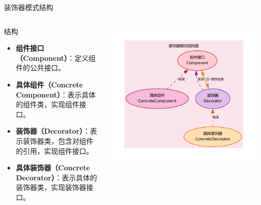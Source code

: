 \documentclass[UTF8,aspectratio=169]{beamer}
\begin{document}
\begin{frame}{装饰器模式结构}
    \begin{columns}
        \begin{column}{0.48\textwidth}
            \begin{ytublock}{结构}
                \begin{itemize}
                    \item \textbf{组件接口（Component）}：定义组件的公共接口。
                    \item \textbf{具体组件（Concrete Component）}：表示具体的组件类，实现组件接口。
                    \item \textbf{装饰器（Decorator）}：表示装饰器类，包含对组件的引用，实现组件接口。
                    \item \textbf{具体装饰器（Concrete Decorator）}：表示具体的装饰器类，实现装饰器接口。
                \end{itemize}
            \end{ytublock}
        \end{column}
        \begin{column}{0.48\textwidth}
            \includegraphics[width=1.0\textwidth]{images/decorator_pattern.pdf}
        \end{column}
    \end{columns}
\end{frame}
\end{document}
